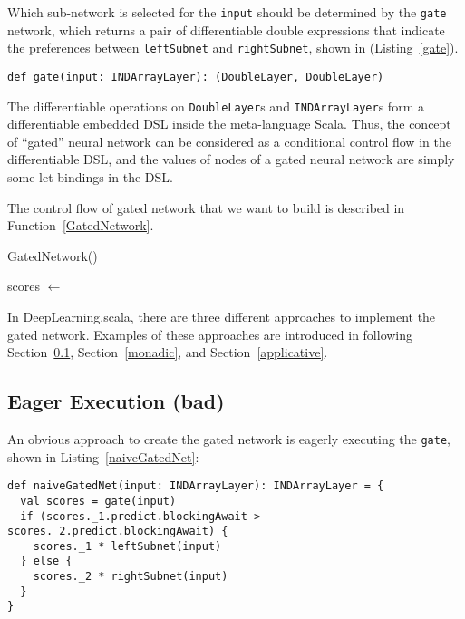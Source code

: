Which sub-network is selected for the \lstinline{input} should be determined by the \lstinline{gate} network, which returns a pair of differentiable double expressions that indicate the preferences between \lstinline{leftSubnet} and \lstinline{rightSubnet}, shown in (Listing~\ref{gate}).

\begin{lstlisting}[float={h t b p},caption={Predefined gate network},label={gate}]
def gate(input: INDArrayLayer): (DoubleLayer, DoubleLayer)
\end{lstlisting}

The differentiable operations on \lstinline{DoubleLayer}s  and \lstinline{INDArrayLayer}s form a differentiable embedded DSL inside the meta-language Scala. Thus, the concept of ``gated'' neural network can be considered as a conditional control flow in the differentiable DSL, and the values of nodes of a gated neural network are simply some let bindings in the DSL.

The control flow of gated network that we want to build is described in Function~\ref{GatedNetwork}.

\begin{function}[H]
  \caption{GatedNetwork()\label{GatedNetwork}}
  scores $\leftarrow$ \;
\end{function}

In DeepLearning.scala, there are three different approaches to implement the gated network. Examples of these approaches are introduced in following Section~\ref{eager}, Section~\ref{monadic}, and Section~\ref{applicative}.

\subsection{Eager Execution (bad)}
\label{eager}

An obvious approach to create the gated network is eagerly executing the \lstinline{gate}, shown in Listing~\ref{naiveGatedNet}:

\begin{lstlisting}[float={h t b p},caption={The eager execution implementation of gated network}, label={naiveGatedNet}]
def naiveGatedNet(input: INDArrayLayer): INDArrayLayer = {
  val scores = gate(input)
  if (scores._1.predict.blockingAwait > scores._2.predict.blockingAwait) {
    scores._1 * leftSubnet(input)
  } else {
    scores._2 * rightSubnet(input)
  }
}
\end{lstlisting}

